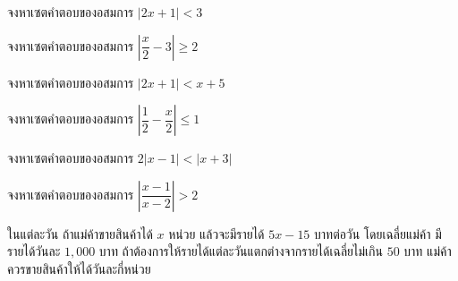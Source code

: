 \begin{examplebox}
จงหาเซตคำตอบของอสมการ $|2 x+1|<3$
\end{examplebox}
\solution
\vspace{5cm}

\begin{examplebox}
จงหาเซตคำตอบของอสมการ $\left|\dfrac{x}{2}-3\right| \geq 2$
\end{examplebox}
\solution
\newpage

\begin{examplebox}
	จงหาเซตคำตอบของอสมการ $\left|2x+1\right|< x+5$
\end{examplebox}
\solution
\newpage

\begin{examplebox}
	จงหาเซตคำตอบของอสมการ $\left|\dfrac{1}{2}-\dfrac{x}{2}\right| \leq 1$
\end{examplebox}
\solution
\newpage

\begin{examplebox}
	จงหาเซตคำตอบของอสมการ $2\left|x-1\right|< \left|x+3\right|$
\end{examplebox}
\solution
\vspace{6cm}
\begin{examplebox}
จงหาเซตคำตอบของอสมการ $\left|\dfrac{x-1}{x-2}\right|>2$
\end{examplebox}
\solution
\newpage
\begin{examplebox}
ในแต่ละวัน ถ้าแม่ค้าขายสินค้าได้ $x$ หน่วย แล้วจะมีรายได้ $5 x-15$ บาทต่อวัน โดยเฉลี่ยแม่ค้า มีรายได้วันละ $1,000$ บาท ถ้าต้องการให้รายได้แต่ละวันแตกต่างจากรายได้เฉลี่ยไม่เกิน $50$ บาท แม่ค้าควรขายสินค้าให้ได้วันละกี่หน่วย
\end{examplebox}
\solution

\newpage
